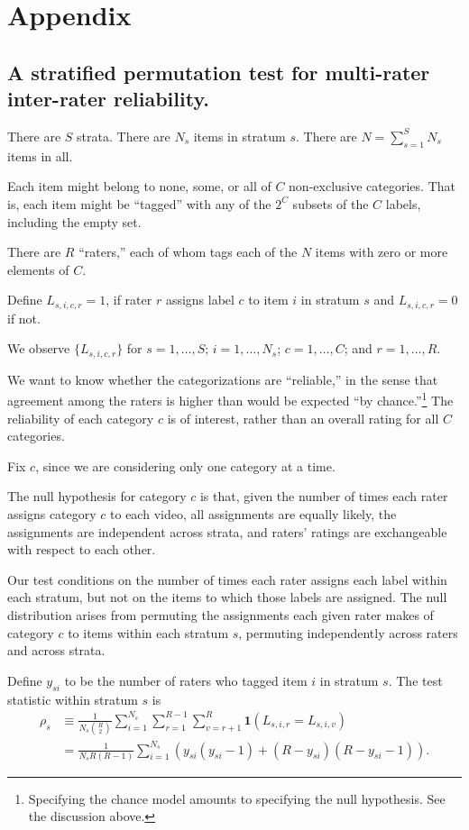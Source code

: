\documentclass[]{article}
\begin{document}
\section*{Appendix}

\subsection*{A stratified permutation test for multi-rater inter-rater reliability.}

There are $S$ strata.
There are $N_s$ items in stratum $s$.
There are $N = \sum_{s=1}^S N_s$ items in all.

Each item might belong to none, some, or all of $C$ non-exclusive categories.
That is, each item might be ``tagged'' with any of the $2^C$ subsets
of the $C$ labels, including the empty set.

There are $R$ ``raters,'' each of whom tags each of the $N$ items with zero
or more elements of $C$.

Define $L_{s,i,c,r} = 1$, if rater $r$ assigns label $c$ to item $i$ in stratum
$s$ and $L_{s,i,c,r} = 0$ if not.

We observe $\{ L_{s,i,c,r} \}$ for $s=1, \dots, S$;  $i=1, \dots, N_s$;
$c=1, \dots, C$; and $r=1, \dots, R$.

We want to know whether the categorizations are ``reliable,'' in the sense that
agreement among the raters is higher than would be expected ``by chance.''\footnote{
   Specifying the chance model amounts to specifying the null hypothesis.
   See the discussion above.
}
The reliability of each category $c$ is of interest, rather than an overall
rating for all $C$ categories.

Fix $c$, since we are considering only one category at a time.

The null hypothesis for category $c$ is that, given the number of times
each rater assigns category $c$ to each video, all assignments
are equally likely, the assignments are independent across strata,
and raters' ratings are exchangeable with respect to
each other.

Our test conditions on the number of times each rater assigns each label within each
stratum, but not on the items to which those labels are assigned.
The null distribution arises from permuting the assignments each given rater makes
of category $c$ to items within each stratum $s$, permuting independently
across raters and across strata.

Define $y_{si}$ to be the number of raters who tagged item $i$ in stratum $s$.
The test statistic within stratum $s$ is
\begin{align*}
\rho_s &\equiv \frac{1}{N_s {R \choose 2}} \sum_{i=1}^{N_s}
              \sum_{r=1}^{R-1} \sum_{v=r+1}^R \mathbf{1}(L_{s,i,r} = L_{s,i,v}) \\
              &= \frac{1}{N_s R(R-1)} \sum_{i=1}^{N_s}
                (y_{si}(y_{si}-1) + (R-y_{si})(R-y_{si}-1)).
\end{align*}
\end{document}
